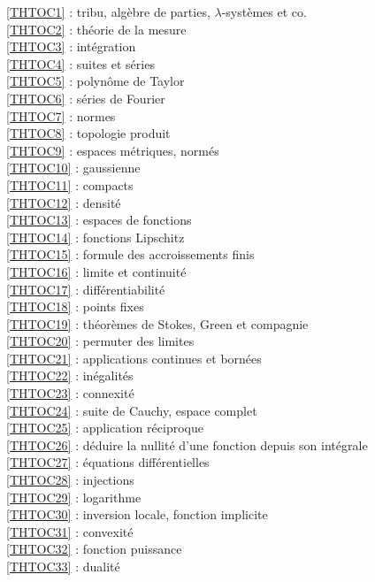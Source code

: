 \ref {THTOC1} : tribu, algèbre de parties, \( \lambda \)-systèmes et co.\\
\ref {THTOC2} : théorie de la mesure\\
\ref {THTOC3} : intégration\\
\ref {THTOC4} : suites et séries\\
\ref {THTOC5} : polynôme de Taylor\\
\ref {THTOC6} : séries de Fourier\\
\ref {THTOC7} : normes\\
\ref {THTOC8} : topologie produit\\
\ref {THTOC9} : espaces métriques, normés\\
\ref {THTOC10} : gaussienne\\
\ref {THTOC11} : compacts\\
\ref {THTOC12} : densité\\
\ref {THTOC13} : espaces de fonctions\\
\ref {THTOC14} : fonctions Lipschitz\\
\ref {THTOC15} : formule des accroissements finis\\
\ref {THTOC16} : limite et continuité\\
\ref {THTOC17} : différentiabilité\\
\ref {THTOC18} : points fixes\\
\ref {THTOC19} : théorèmes de Stokes, Green et compagnie\\
\ref {THTOC20} : permuter des limites\\
\ref {THTOC21} : applications continues et bornées\\
\ref {THTOC22} : inégalités\\
\ref {THTOC23} : connexité\\
\ref {THTOC24} : suite de Cauchy, espace complet\\
\ref {THTOC25} : application réciproque\\
\ref {THTOC26} : déduire la nullité d'une fonction depuis son intégrale\\
\ref {THTOC27} : équations différentielles\\
\ref {THTOC28} : injections\\
\ref {THTOC29} : logarithme\\
\ref {THTOC30} : inversion locale, fonction implicite\\
\ref {THTOC31} : convexité\\
\ref {THTOC32} : fonction puissance\\
\ref {THTOC33} : dualité\\
